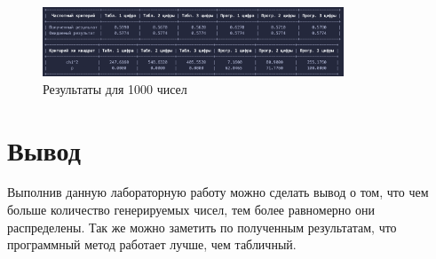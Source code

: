 \begin{figure}[H]
    \centering
    \includegraphics[width=0.8\textwidth]{img/content/1000.png}
    \caption{Результаты для 1000 чисел}
    \label{fig:}
\end{figure}

\section{Вывод}

Выполнив данную лабораторную работу можно сделать вывод о том, что чем больше количество генерируемых чисел, тем более равномерно они распределены. Так же можно заметить по полученным результатам, что программный метод работает лучше, чем табличный.
